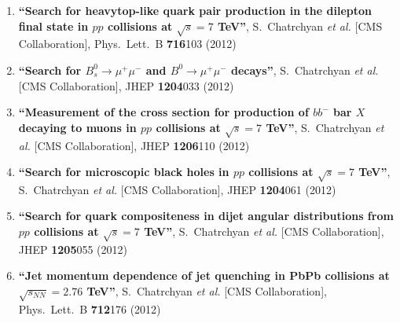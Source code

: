 \begin{enumerate}
\item%
{\bf ``Search for heavytop-like quark pair production in the dilepton final state in $pp$ collisions at $\sqrt{s} = 7$ TeV''}, 
  S.~Chatrchyan {\it et al.}  [CMS Collaboration], 
Phys.\ Lett.\ B {\bf 716}103 (2012) %


\item%
{\bf ``Search for $B^0_s \to \mu^+ \mu^-$ and $B^0 \to \mu^+ \mu^-$ decays''}, 
  S.~Chatrchyan {\it et al.}  [CMS Collaboration], 
JHEP {\bf 1204}033 (2012) %


\item%
{\bf ``Measurement of the cross section for production of $b b^-$ bar $X$decaying to muons in $pp$ collisions at $\sqrt{s}=7$ TeV''}, 
  S.~Chatrchyan {\it et al.}  [CMS Collaboration], 
JHEP {\bf 1206}110 (2012) %


\item%
{\bf ``Search for microscopic black holes in $pp$ collisions at $\sqrt{s}=7$ TeV''}, 
  S.~Chatrchyan {\it et al.}  [CMS Collaboration], 
JHEP {\bf 1204}061 (2012) %


\item%
{\bf ``Search for quark compositeness in dijet angular distributions from $pp$ collisions at $\sqrt{s}=7$ TeV''}, 
  S.~Chatrchyan {\it et al.}  [CMS Collaboration], 
JHEP {\bf 1205}055 (2012) %


\item%
{\bf ``Jet momentum dependence of jet quenching in PbPb collisions at $\sqrt{s_{NN}}=2.76$ TeV''}, 
  S.~Chatrchyan {\it et al.}  [CMS Collaboration], 
Phys.\ Lett.\ B {\bf 712}176 (2012) %



\end{enumerate}
